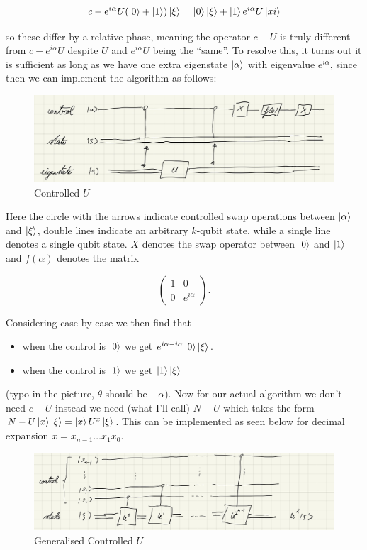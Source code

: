 \documentclass{article}
\theoremstyle{definition}
\begin{document}
$$ c-e^{i\alpha} U (\ket{0} + \ket{1}) \ket{\xi} = \ket{0} \ket{\xi} +
\ket{1} e^{i\alpha} U \ket{xi} $$

so these differ by a relative phase, meaning the operator $c-U$ is truly
different from $c-e^{i\alpha} U$ despite $U$ and $e^{i \alpha}U$ being the
``same''. To resolve this, it turns out it is sufficient as long as we have one
extra eigenstate $\ket{\alpha}$ with eigenvalue $e^{i\alpha}$, since then we can
implement the algorithm as follows:

\begin{figure}[H]
  \centering
  \includegraphics[width=12cm]{res/QC/controlled_U}
  \caption{Controlled $U$}
  \label{figure: controlled_U}
\end{figure}

Here the circle with the arrows indicate controlled swap operations between
$\ket{\alpha}$ and $\ket{\xi}$, double lines indicate an arbitrary
$k$-qubit state, while a single line denotes a single qubit state. $X$ denotes
the swap operator between $\ket{0}$ and $\ket{1}$ and $f(\alpha)$ denotes the
matrix

$$
\begin{pmatrix}
  1 & 0 \\
  0 & e^{i \alpha}
\end{pmatrix}.
$$

Considering case-by-case we then find that

\begin{itemize}
\item when the control is $\ket{0}$ we get $e^{i\alpha - i\alpha} \ket{0} \ket{\xi}$.
\item when the control is $\ket{1}$ we get $\ket{1} \ket{\xi}$
\end{itemize}

(typo in the picture, $\theta$ should be $-\alpha$). Now for our actual
algorithm we don't need $c-U$ instead we need (what I'll call) $N-U$ which takes
the form $N-U\ket{x}\ket{\xi} = \ket{x} U^x \ket{\xi}$. This can be implemented
as seen below for decimal expansion $x = x_{n-1} \dots x_1 x_0$.

\begin{figure}[H]
  \centering
  \includegraphics[width=12cm]{res/QC/generalised_controlled_U}
  \caption{Generalised Controlled $U$}
  \label{figure: generalised_controlled_U}
\end{figure}
\end{document}
